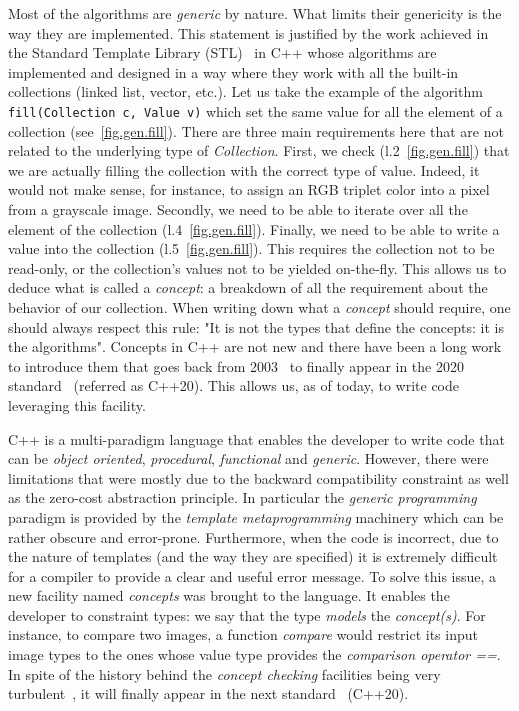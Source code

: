 Most of the algorithms are \emph{generic} by nature. What limits their genericity is the way they are implemented. This
statement is justified by the work achieved in the Standard Template Library (STL)~\parencite{dehnert.1998.fundamentals}
in C++ whose algorithms are implemented and designed in a way where they work with all the built-in collections (linked
list, vector, etc.). Let us take the example of the algorithm \texttt{fill(Collection c, Value v)} which set the same
value for all the element of a collection (see~\cref{fig.gen.fill}). There are three main requirements here that are not
related to the underlying type of \emph{Collection}. First, we check (l.2~\ref{fig.gen.fill}) that we are actually
filling the collection with the correct type of value. Indeed, it would not make sense, for instance, to assign an RGB
triplet color into a pixel from a grayscale image. Secondly, we need to be able to iterate over all the element of the
collection (l.4~\ref{fig.gen.fill}). Finally, we need to be able to write a value into the collection
(l.5~\ref{fig.gen.fill}). This requires the collection not to be read-only, or the collection's values not to be yielded
on-the-fly. This allows us to deduce what is called a \emph{concept}: a breakdown of all the requirement about the
behavior of our collection. When writing down what a \emph{concept} should require, one should always respect this rule:
"It is not the types that define the concepts: it is the algorithms". Concepts in C++ are not new and there have been a
long work to introduce them that goes back from
2003~\parencite{seymour.2009.concepts,stroustrup.2003.concepts,sutton.2017.concepts} to finally appear in the 2020
standard~\cite{voutilainen.2017.concepts} (referred as C++20). This allows us, as of today, to write code leveraging
this facility.

C++ is a multi-paradigm language that enables the developer to write code that can be \emph{object oriented},
\emph{procedural}, \emph{functional} and \emph{generic}. However, there were limitations that were mostly due to the
backward compatibility constraint as well as the zero-cost abstraction principle. In particular the \emph{generic
  programming} paradigm is provided by the \emph{template metaprogramming} machinery which can be rather obscure and
error-prone. Furthermore, when the code is incorrect, due to the nature of templates (and the way they are specified) it
is extremely difficult for a compiler to provide a clear and useful error message. To solve this issue, a new facility
named \emph{concepts} was brought to the language. It enables the developer to constraint types: we say that the type
\emph{models} the \emph{concept(s)}. For instance, to compare two images, a function \emph{compare} would restrict its
input image types to the ones whose value type provides the \emph{comparison operator ==}. In spite of the history
behind the \emph{concept checking} facilities being very
turbulent~\parencite{seymour.2009.concepts,stroustrup.2003.concepts,sutton.2017.concepts}, it will finally appear in the
next standard~\cite{voutilainen.2017.concepts} (C++20).

